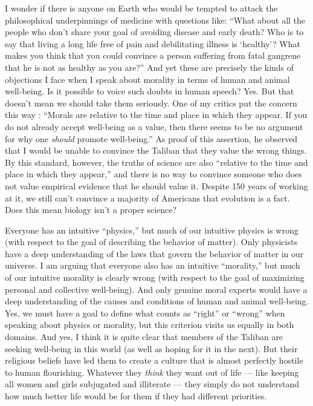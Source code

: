 \documentclass[a4paper,14pt]{extbook}
\begin{document}
I wonder if there is anyone on Earth who would be tempted to attack the philosophical underpinnings of medicine with questions like: ``What about all the people who don't share your goal of avoiding disease and early death?
Who is to say that living a long life free of pain and debilitating illness is `healthy'?
What makes you think that you could convince a person suffering from fatal gangrene that he is not as healthy as you are?''
And yet these are precisely the kinds of objections I face when I speak about morality in terms of human and animal well-being.
Is it possible to voice such doubts in human speech?
Yes.
But that doesn't mean we should take them seriously.
One of my critics put the concern this way :
``Morals are relative to the time and place in which they appear.
If you do not already accept well-being as a value, then there seems to be no argument for why one \textit{should} promote well-being.''
As proof of this assertion, he observed that I would be unable to convince the Taliban that they value the wrong things.
By this standard, however, the truths of science are also ``relative to the time and place in which they appear,'' and there is no way to convince someone who does not value empirical evidence that he should value it.
Despite 150 years of working at it, we still can't convince a majority of Americans that evolution is a fact.
Does this mean biology isn't a proper science?

Everyone has an intuitive ``physics,'' but much of our intuitive physics is wrong (with respect to the goal of describing the behavior of matter).
Only physicists have a deep understanding of the laws that govern the behavior of matter in our universe.
I am arguing that everyone also has an intuitive ``morality,'' but much of our intuitive morality is clearly wrong (with respect to the goal of maximizing personal and collective well-being).
And only genuine moral experts would have a deep understanding of the causes and conditions of human and animal well-being.
Yes, we must have a goal to define what counts as ``right'' or ``wrong'' when speaking about physics or morality, but this criterion visits us equally in both domains.
And yes, I think it is quite clear that members of the Taliban are seeking well-being in this world (as well as hoping for it in the next).
But their religious beliefs have led them to create a culture that is almost perfectly hostile to human flourishing.
Whatever they \textit{think} they want out of life --- like keeping all women and girls subjugated and illiterate --- they simply do not understand how much better life would be for them if they had different priorities.
\end{document}

